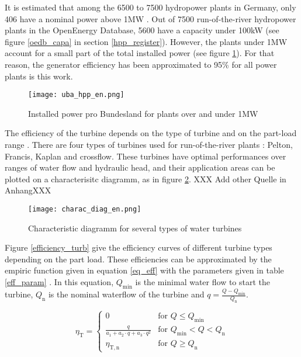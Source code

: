 It is estimated that among the 6500 to 7500 hydropower plants in Germany, only 406 have a nominal power above 1MW \cite{uba_wasserkraft}. Out of 7500 run-of-the-river hydropower plants in the OpenEnergy Database, 5600 have a capacity under 100kW (see figure \ref{oedb_capa} in section \ref{hpp_register}).  However, the plants under 1MW account for a small part of the total installed power (see figure \ref{uba_hpp}). For that reason, the generator efficiency has been approximated to 95\% for all power plants is this work.

\begin{figure}[H]
\texttt{[image: uba\_hpp\_en.png]}
\caption[Installed power pro Bundesland for plants over and under 1MW]{Installed power pro Bundesland for plants over and under 1MW \cite{uba_wasserkraft}}
\centering
\label{uba_hpp}
\end{figure}

The efficiency of the turbine depends on the type of turbine and on the part-load range \cite{quaschning}\cite{pacer}. There are four types of turbines used for run-of-the-river plants : Pelton, Francis, Kaplan and crossflow. These turbines have optimal performances over ranges of water flow and hydraulic head, and their application areas can be plotted on a characterisitc diagramm, as in figure \ref{charac_diag}. XXX Add other Quelle in AnhangXXX

\begin{figure}[H]
\texttt{[image: charac\_diag\_en.png]}
\caption[Characteristic diagramm for several types of water turbines]{Characteristic diagramm for several types of water turbines \cite{wiki_WK}}
\centering
\label{charac_diag}
\end{figure}

Figure \ref{efficiency_turb} give the efficiency curves of different turbine types depending on the part load. These efficiencies can be approximated by the empiric function given in equation \ref{eq_eff} with the parameters given in table \ref{eff_param} \cite{quaschning}. In this equation, $Q_\mathrm{min}$ is the minimal water flow to start the turbine, $Q_\mathrm{n}$ is the nominal waterflow of the turbine and $q=\frac{Q-Q_\mathrm{min}}{Q_\mathrm{n}}$.

\begin{equation}
 \label{eq_eff}
\eta_\mathrm{T}= \left\{
    \begin{array}{ll}
	0 & \mbox{for } Q \leq Q_\mathrm{min}\\
        \frac{q}{a_\mathrm{1}+a_\mathrm{2} \cdot q + a_\mathrm{3} \cdot q^2} & \mbox{for } Q_\mathrm{min}<Q<Q_\mathrm{n} \\
        \eta_\mathrm{T,n} & \mbox{for } Q \geq Q_\mathrm{n}
    \end{array}
\right.
\end{equation}


